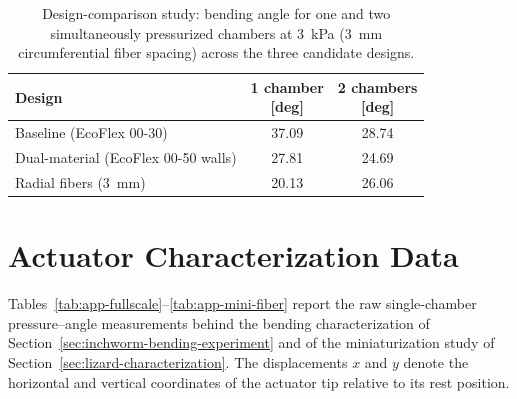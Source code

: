 \begin{table}[tbh]
  \caption{Design-comparison study: bending angle for one and two
  simultaneously pressurized chambers at 3~kPa (3~mm circumferential fiber
  spacing) across the three candidate designs.}
  \label{tab:app-designcomparison}
  \centering
  \footnotesize
  \setlength{\tabcolsep}{5pt}
  \begin{tabular}{|l|c|c|}
    \hline
    Design & \makecell{1 chamber\\{[}deg{]}} & \makecell{2 chambers\\{[}deg{]}} \\ \hline
    Baseline (EcoFlex 00-30) & 37.09 & 28.74 \\ \hline
    Dual-material (EcoFlex 00-50 walls) & 27.81 & 24.69 \\ \hline
    Radial fibers (3~mm) & 20.13 & 26.06 \\ \hline
  \end{tabular}
\end{table}

\section{Actuator Characterization Data}
\label{app:actuator-data}

Tables~\ref{tab:app-fullscale}--\ref{tab:app-mini-fiber} report the raw
single-chamber pressure--angle measurements behind the bending
characterization of Section~\ref{sec:inchworm-bending-experiment} and of the
miniaturization study of Section~\ref{sec:lizard-characterization}. The
displacements $x$ and $y$ denote the horizontal and vertical coordinates of
the actuator tip relative to its rest position.

